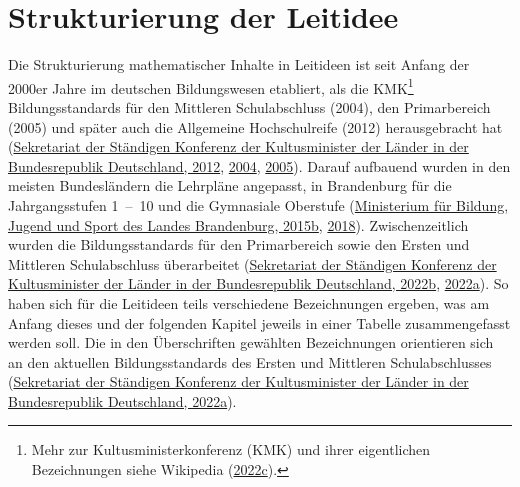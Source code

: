 \documentclass[
]{scrbook}
\theoremstyle{definition}
\theoremstyle{definition}
\theoremstyle{definition}
\theoremstyle{definition}
\theoremstyle{remark}
\begin{document}
\hypertarget{strukturierung-der-leitidee-zahl-und-operation}{%
\section{Strukturierung der Leitidee}\label{strukturierung-der-leitidee-zahl-und-operation}}

Die Strukturierung mathematischer Inhalte in Leitideen ist seit Anfang der 2000er Jahre im deutschen Bildungswesen etabliert, als die KMK\footnote{Mehr zur Kultusministerkonferenz (KMK) und ihrer eigentlichen Bezeichnungen siehe Wikipedia (\protect\hyperlink{ref-dewiki:228417777}{2022c}).} Bildungsstandards für den Mittleren Schulabschluss (2004), den Primarbereich (2005) und später auch die Allgemeine Hochschulreife (2012) herausgebracht hat (\protect\hyperlink{ref-KMK:2012}{Sekretariat der Ständigen Konferenz der Kultusminister der Länder in der Bundesrepublik Deutschland, 2012}, \protect\hyperlink{ref-KMK:2004a}{2004}, \protect\hyperlink{ref-KMK2005}{2005}). Darauf aufbauend wurden in den meisten Bundesländern die Lehrpläne angepasst, in Brandenburg für die Jahrgangsstufen 1~--~10 und die Gymnasiale Oberstufe (\protect\hyperlink{ref-MinisteriumfurBildungJugendundSportdesLandesBrandenburg2015a}{Ministerium für Bildung, Jugend und Sport des Landes Brandenburg, 2015b}, \protect\hyperlink{ref-MinisteriumfurBildungJugendundSportdesLandesBrandenburg2018}{2018}). Zwischenzeitlich wurden die Bildungsstandards für den Primarbereich sowie den Ersten und Mittleren Schulabschluss überarbeitet (\protect\hyperlink{ref-SekretariatderStandigenKonferenzderKultusministerderLanderinderBundesrepublikDeutschland2022a}{Sekretariat der Ständigen Konferenz der Kultusminister der Länder in der Bundesrepublik Deutschland, 2022b}, \protect\hyperlink{ref-SekretariatderStandigenKonferenzderKultusministerderLanderinderBundesrepublikDeutschland2022}{2022a}). So haben sich für die Leitideen teils verschiedene Bezeichnungen ergeben, was am Anfang dieses und der folgenden Kapitel jeweils in einer Tabelle zusammengefasst werden soll. Die in den Überschriften gewählten Bezeichnungen orientieren sich an den aktuellen Bildungsstandards des Ersten und Mittleren Schulabschlusses (\protect\hyperlink{ref-SekretariatderStandigenKonferenzderKultusministerderLanderinderBundesrepublikDeutschland2022}{Sekretariat der Ständigen Konferenz der Kultusminister der Länder in der Bundesrepublik Deutschland, 2022a}).
\end{document}

